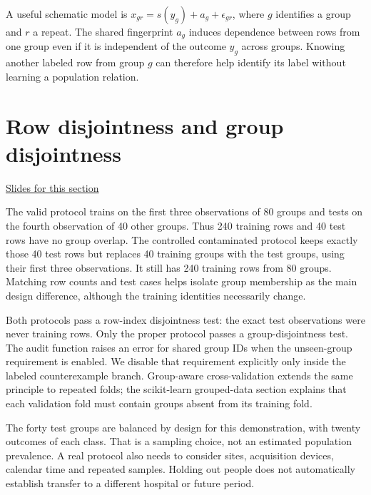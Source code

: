 \documentclass[11pt,letterpaper]{article}
\theoremstyle{definition}\newtheorem{definition}{Definition}\newtheorem{example}{Example}
\numberwithin{equation}{section}
\begin{document}
A useful schematic model is $x_{gr}=s(y_g)+a_g+\epsilon_{gr}$, where $g$ identifies a group and $r$ a repeat. The shared fingerprint $a_g$ induces dependence between rows from one group even if it is independent of the outcome $y_g$ across groups. Knowing another labeled row from group $g$ can therefore help identify its label without learning a population relation.
\section{Row disjointness and group disjointness}
\hypertarget{note-row-disjointness-and-group-disjointness}{}\label{note:row-disjointness-and-group-disjointness}
{\small \href{slides.html\#frame=the-new-group-condition-panel-1\&step=1}{Slides for this section}}\par
The valid protocol trains on the first three observations of 80 groups and tests on the fourth observation of 40 other groups. Thus 240 training rows and 40 test rows have no group overlap. The controlled contaminated protocol keeps exactly those 40 test rows but replaces 40 training groups with the test groups, using their first three observations. It still has 240 training rows from 80 groups. Matching row counts and test cases helps isolate group membership as the main design difference, although the training identities necessarily change.

Both protocols pass a row-index disjointness test: the exact test observations were never training rows. Only the proper protocol passes a group-disjointness test. The audit function raises an error for shared group IDs when the unseen-group requirement is enabled. We disable that requirement explicitly only inside the labeled counterexample branch. Group-aware cross-validation extends the same principle to repeated folds; the scikit-learn grouped-data section explains that each validation fold must contain groups absent from its training fold.

The forty test groups are balanced by design for this demonstration, with twenty outcomes of each class. That is a sampling choice, not an estimated population prevalence. A real protocol also needs to consider sites, acquisition devices, calendar time and repeated samples. Holding out people does not automatically establish transfer to a different hospital or future period.
\end{document}
